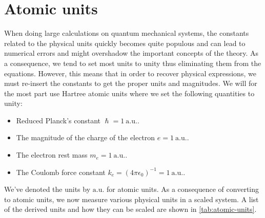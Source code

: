     \section{Atomic units}
        When doing large calculations on quantum mechanical systems, the
        constants related to the physical units quickly becomes quite populous
        and can lead to numerical errors and might overshadow the important
        concepts of the theory.
        As a consequence, we tend to set most units to unity thus eliminating
        them from the equations.
        However, this means that in order to recover physical expressions, we
        must re-insert the constants to get the proper units and magnitudes.
        We will for the most part use Hartree atomic units \cite{hartree_1928}
        where we set the following quantities to unity:
        \begin{itemize}
            \item Reduced Planck's constant $\hslash = \SI{1}{\text{a.u.}}$.
            \item The magnitude of the charge of the electron
                $e = \SI{1}{\text{a.u.}}$.
            \item The electron rest mass $m_e = \SI{1}{\text{a.u.}}$.
            \item The Coulomb force constant
                $k_e = (4\pi \epsilon_0)^{-1} = \SI{1}{\text{a.u.}}$.
        \end{itemize}
        We've denoted the units by $\si{\text{a.u.}}$ for atomic units.
        As a consequence of converting to atomic units, we now measure various
        physical units in a scaled system.
        A list of the derived units and how they can be scaled are shown in
        \autoref{tab:atomic-units}.
